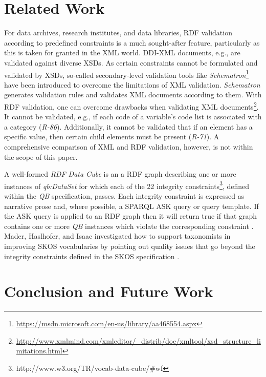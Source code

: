 \documentclass{llncs}
\begin{document}
{{\section{Related Work}

For data archives, research institutes, and data libraries,
RDF validation according to predefined constraints is a much sought-after feature, 
particularly as this is taken for granted in the XML world.
DDI-XML documents, e.g., are validated against diverse XSDs\footnotemark[\ref{fnt:DDI-XSDs}].
As certain constraints cannot be formulated and validated by XSDs, 
so-called secondary-level validation tools like \emph{Schematron}\footnote{\url{https://msdn.microsoft.com/en-us/library/aa468554.aspx}} have been introduced to overcome the limitations of XML validation.
\emph{Schematron} generates validation rules and validates XML documents according to them.
With RDF validation, one can overcome drawbacks when validating XML documents\footnote{\url{http://www.xmlmind.com/xmleditor/_distrib/doc/xmltool/xsd_structure_limitations.html}}.
It cannot be validated, e.g., if each code of a variable's code list is associated with a category (\emph{R-86}).
Additionally, it cannot be validated that if an element has a specific value, then certain child elements must be present (\emph{R-71}).  
A comprehensive comparison of XML and RDF validation, however, is not within the scope of this paper.

A well-formed \emph{RDF Data Cube} is an a RDF graph describing one or more instances of \emph{qb:DataSet} for which each of the 22 integrity constraints\footnote{http://www.w3.org/TR/vocab-data-cube/\#wf}, defined within the \emph{QB} specification, passes.
Each integrity constraint is expressed as narrative prose and, where possible, a SPARQL ASK query or query template. 
If the ASK query is applied to an RDF graph then it will return true if that graph contains one or more \emph{QB} instances which violate the corresponding constraint \cite{CyganiakReynolds2014}.
Mader, Haslhofer, and Isaac investigated how to support
taxonomists in improving SKOS vocabularies by pointing out quality
issues that go beyond the integrity constraints defined in the SKOS specification \cite{MaderHaslhoferIsaac2012}.

\section{Conclusion and Future Work}

}}
\end{document}
